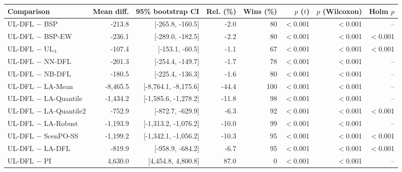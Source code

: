 \begin{tabular}{lrrrrrrr}
\toprule
Comparison & Mean diff. & 95\% bootstrap CI & Rel. (\%) & Wins (\%) & $p$ ($t$) & $p$ (Wilcoxon) & Holm $p$ \\
\midrule
UL-DFL $-$ BSP & -213.8 & [-265.8, -160.5] & -2.0 & 80 & $<$0.001 & $<$0.001 & -- \\
UL-DFL $-$ BSP-EW & -236.1 & [-289.0, -182.5] & -2.2 & 80 & $<$0.001 & $<$0.001 & $<$0.001 \\
UL-DFL $-$ UL$_\lambda$ & -107.4 & [-153.1, -60.5] & -1.1 & 67 & $<$0.001 & $<$0.001 & $<$0.001 \\
UL-DFL $-$ NN-DFL & -201.3 & [-254.4, -149.7] & -1.7 & 78 & $<$0.001 & $<$0.001 & -- \\
UL-DFL $-$ NB-DFL & -180.5 & [-225.4, -136.3] & -1.6 & 80 & $<$0.001 & $<$0.001 & -- \\
UL-DFL $-$ LA-Mean & -8,465.5 & [-8,764.1, -8,175.6] & -44.4 & 100 & $<$0.001 & $<$0.001 & -- \\
UL-DFL $-$ LA-Quantile & -1,434.2 & [-1,585.6, -1,278.2] & -11.8 & 98 & $<$0.001 & $<$0.001 & -- \\
UL-DFL $-$ LA-Quantile2 & -752.9 & [-872.7, -629.9] & -6.3 & 92 & $<$0.001 & $<$0.001 & $<$0.001 \\
UL-DFL $-$ LA-Robust & -1,193.9 & [-1,313.2, -1,076.2] & -10.0 & 99 & $<$0.001 & $<$0.001 & -- \\
UL-DFL $-$ ScenPO-SS & -1,199.2 & [-1,342.1, -1,056.2] & -10.3 & 95 & $<$0.001 & $<$0.001 & $<$0.001 \\
UL-DFL $-$ LA-DFL & -819.9 & [-958.9, -684.2] & -6.7 & 95 & $<$0.001 & $<$0.001 & $<$0.001 \\
UL-DFL $-$ PI & 4,630.0 & [4,454.8, 4,800.8] & 87.0 & 0 & $<$0.001 & $<$0.001 & -- \\
\bottomrule
\end{tabular}
